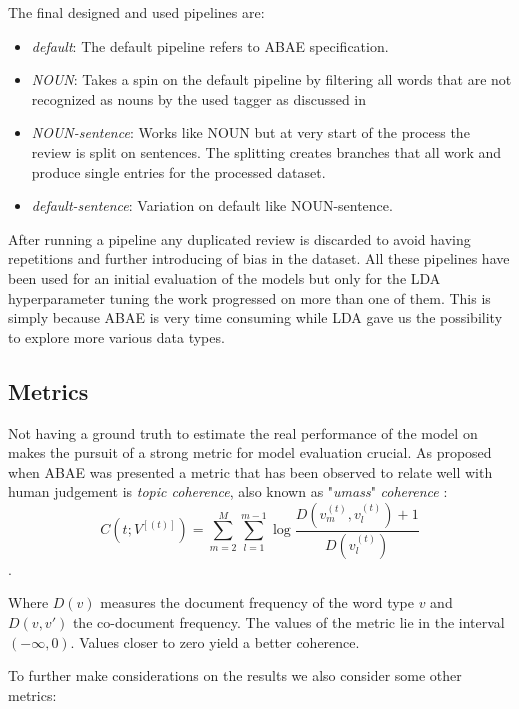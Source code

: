 The final designed and used pipelines are:
\begin{itemize}
    \item {\textit{default}}: The default pipeline refers to ABAE specification.

    \item {\textit{NOUN}}: Takes a spin on the default pipeline by filtering all words that are not recognized as nouns
    by the used tagger as discussed in %

    \item {\textit{NOUN-sentence}}: Works like NOUN but at very start of the process the review is split on sentences.
    The splitting creates branches that all work and produce single entries for the processed dataset.

    \item {\textit{default-sentence}}: Variation on default like NOUN-sentence.
\end{itemize}

After running a pipeline any duplicated review is discarded to avoid having repetitions and further introducing of
bias in the dataset.
All these pipelines have been used for an initial evaluation of the models but only for the LDA hyperparameter
tuning the work progressed on more than one of them. This is simply because ABAE is very time consuming while LDA
gave us the possibility to explore more various data types.

\subsection{Metrics}
Not having a ground truth to estimate the real performance of the model on makes the pursuit of a strong metric
for model evaluation crucial.
As proposed when ABAE was presented \cite{he-etal-2017-unsupervised} a metric that has been observed to relate
well with human judgement is \textit{topic coherence}, also known as "\textit{umass}" \textit{coherence} \cite{mimno-etal-2011-optimizing}:
$$C(t;V^[(t)]) = \sum^M_{m=2} \sum^{m-1}_{l=1} \log \frac{D(v_m^{(t)}, v_l^{(t)}) + 1}{D(v_l^{(t)})} $$.

Where $D(v)$ measures the document frequency of the word type $v$ and $D(v,v')$ the co-document frequency.
The values of the metric lie in the interval $(-\infty, 0)$. Values closer to zero yield a better coherence.

To further make considerations on the results we also consider some other metrics:

